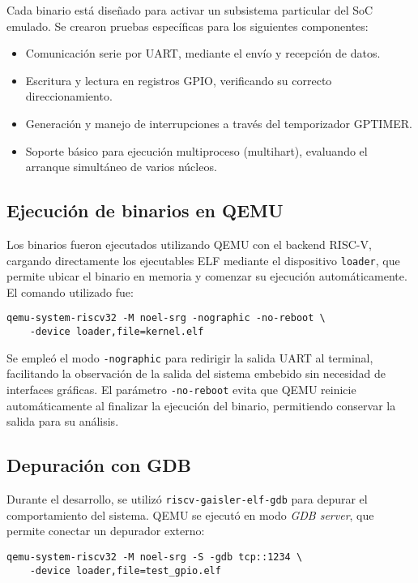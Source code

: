 Cada binario está diseñado para activar un subsistema particular del SoC emulado. Se crearon pruebas específicas para los siguientes componentes:
\begin{itemize}
    \item Comunicación serie por UART, mediante el envío y recepción de datos.
    \item Escritura y lectura en registros GPIO, verificando su correcto direccionamiento.
    \item Generación y manejo de interrupciones a través del temporizador GPTIMER.
    \item Soporte básico para ejecución multiproceso (multihart), evaluando el arranque simultáneo de varios núcleos.
\end{itemize}

\subsection*{Ejecución de binarios en QEMU}

Los binarios fueron ejecutados utilizando QEMU con el backend RISC-V, cargando directamente los ejecutables ELF mediante el dispositivo \texttt{loader}, que permite ubicar el binario en memoria y comenzar su ejecución automáticamente. El comando utilizado fue:

\begin{verbatim}
qemu-system-riscv32 -M noel-srg -nographic -no-reboot \
    -device loader,file=kernel.elf
\end{verbatim}

Se empleó el modo \texttt{-nographic} para redirigir la salida UART al terminal, facilitando la observación de la salida del sistema embebido sin necesidad de interfaces gráficas. El parámetro \texttt{-no-reboot} evita que QEMU reinicie automáticamente al finalizar la ejecución del binario, permitiendo conservar la salida para su análisis.

\subsection*{Depuración con GDB}

Durante el desarrollo, se utilizó \texttt{riscv-gaisler-elf-gdb} para depurar el comportamiento del sistema. QEMU se ejecutó en modo \emph{GDB server}, que permite conectar un depurador externo:

\begin{verbatim}
qemu-system-riscv32 -M noel-srg -S -gdb tcp::1234 \
    -device loader,file=test_gpio.elf
\end{verbatim}

